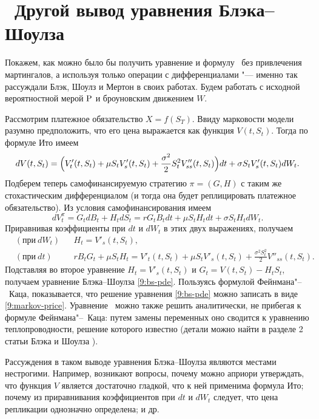 

\section{\difficult\ Другой вывод уравнения Блэка--Шоулза}
Покажем, как можно было бы получить уравнение и формулу \bs\ без привлечения мартингалов, а используя только операции с дифференциалами "--- именно так рассуждали Блэк, Шоулз и Мертон в своих работах.
Будем работать с исходной вероятностной мерой $\P$ и броуновским движением $W$.

Рассмотрим платежное обязательство $X = f(S_T)$.
Ввиду марковости модели разумно предположить, что его цена выражается как функция $V(t,S_t)$. Тогда по формуле Ито имеем
\[
d V(t,S_t) = \Bigl(V'_t(t,S_t) + \mu S_t V'_s(t,S_t) + \frac{\sigma^2}2 S_t^2 V''_{ss}(t,S_t) \Bigr) dt + \sigma S_t V'_s(t,S_t) dW_t.
\]
Подберем теперь самофинансируемую стратегию $\pi=(G,H)$ с таким же стохастическим дифференциалом (и тогда она будет реплицировать платежное обязательство).
Из условия самофинансирования имеем
\[
d V_t^\pi = G_t d B_t + H_t d S_t = rG_t B_t dt + \mu S_t H_t dt + \sigma S_t H_t dW_t. 
\]
Приравнивая коэффициенты при $dt$ и $dW_t$ в этих двух выражениях, получаем
\begin{align*}
&(\text{при}\ dW_t)& &H_t = V'_s(t,S_t),\\
&(\text{при}\ dt)& &r B_t G_t + \mu S_t H_t = V'_t(t,S_t) + \mu S_t V'_s(t,S_t) 
  + \frac{\sigma^2 S_t^2}{2} V''_{ss}(t, S_t).
\end{align*}
Подставляя во второе уравнение $H_t = V'_s(t,S_t)$ и $G_t = V(t,S_t) - H_t S_t$, получаем уравнение Блэка--Шоулза \eqref{9:bs-pde}.
Пользуясь формулой Фейнмана"--~Каца, показывается, что решение уравнения \eqref{9:bs-pde} можно записать в виде \eqref{9:markov-price}.
Уравнение \bs\ можно также решить аналитически, не прибегая к формуле Фейнмана"--~Каца: путем замены переменных оно сводится к уравнению теплопроводности, решение которого известно (детали можно найти в разделе 2 статьи Блэка и Шоулза \cite{BlackScholes73}).


\begin{remark}
Рассуждения в таком выводе уравнения Блэка--Шоулза являются местами нестрогими.
Например, возникают вопросы, почему можно априори утверждать, что функция $V$ является достаточно гладкой, что к ней применима формула Ито; почему из приравнивания коэффициентов при $dt$ и $dW_t$ следует, что цена репликации однозначно определена; и др.
\end{remark}


